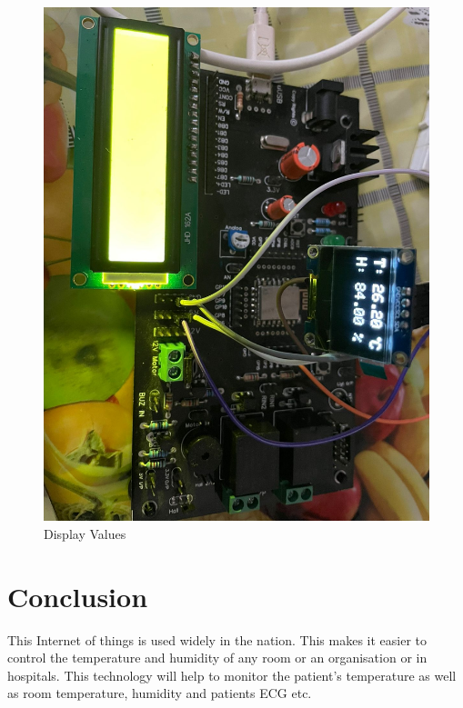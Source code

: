 \documentclass[12pt,a4paper,twocolumn,fleqn]{article}
\begin{document}
\begin{figure} [H]
\includegraphics[width=15cm]{media/OLED.jpeg}
\centering
\caption{Display Values}
\end{figure}
\newpage
  \pagestyle{fancy}
  \thispagestyle{empty}
  \thispagestyle{plain}
  \fancyhf{}
  \chead{}
\renewcommand{\footrulewidth}{0.4pt}%
\normalsize
\section*{Conclusion} 
This Internet of things is used widely in the nation. This makes it easier to control the temperature and humidity of any room or an organisation or in hospitals. This technology will help to monitor the patient's temperature as well as room temperature, humidity and patients ECG etc. 
\end{document}

